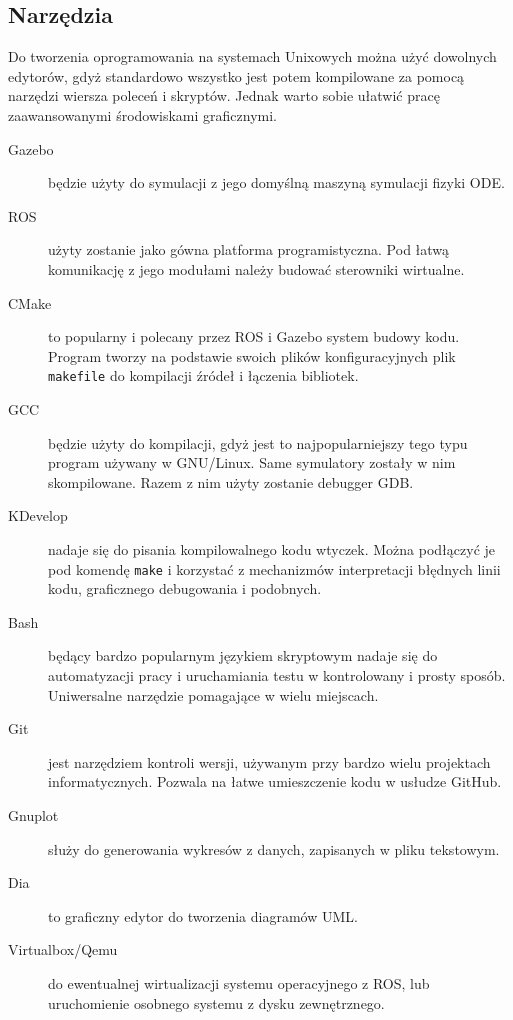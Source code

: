 	\subsection{Narzędzia}
		Do tworzenia oprogramowania na systemach Unixowych można użyć dowolnych edytorów, gdyż standardowo wszystko jest potem kompilowane za pomocą narzędzi wiersza poleceń i skryptów.
		Jednak warto sobie ułatwić pracę zaawansowanymi środowiskami graficznymi.
		\begin{description}
		\item[Gazebo] będzie użyty do symulacji z jego domyślną maszyną symulacji fizyki ODE.
		\item[ROS] użyty zostanie jako gówna platforma programistyczna. Pod łatwą komunikację z jego modułami należy budować sterowniki wirtualne.
		\item[CMake] to popularny i polecany przez ROS i Gazebo system budowy kodu. Program tworzy na podstawie swoich plików konfiguracyjnych plik \texttt{makefile} do kompilacji źródeł i łączenia bibliotek.
		\item[GCC] będzie użyty do kompilacji, gdyż jest to najpopularniejszy tego typu program używany w GNU/Linux. Same symulatory zostały w nim skompilowane.
		Razem z nim użyty zostanie debugger GDB. 
		\item[KDevelop] nadaje się do pisania kompilowalnego kodu wtyczek. Można podłączyć je pod komendę \texttt{make} i korzystać z mechanizmów interpretacji błędnych linii kodu, graficznego debugowania i podobnych.
		\item[Bash] będący bardzo popularnym językiem skryptowym nadaje się do automatyzacji pracy i uruchamiania testu w kontrolowany i prosty sposób.
		Uniwersalne narzędzie pomagające w wielu miejscach.
		\item[Git] jest narzędziem kontroli wersji, używanym przy bardzo wielu projektach informatycznych. Pozwala na łatwe umieszczenie kodu w usłudze GitHub.
		\item[Gnuplot] służy do generowania wykresów z danych, zapisanych w pliku tekstowym.
		\item[Dia] to graficzny edytor do tworzenia diagramów UML.
		\item[Virtualbox/Qemu] do ewentualnej wirtualizacji systemu operacyjnego z ROS, lub uruchomienie osobnego systemu z dysku zewnętrznego.
		\end{description}


